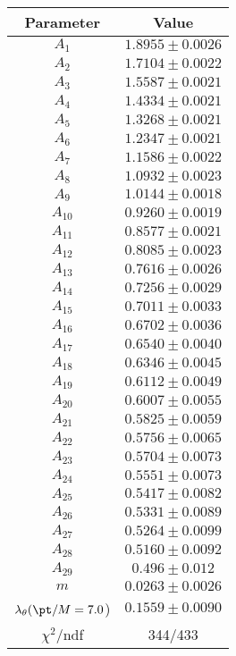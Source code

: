 \begin{tabular}{c|c}
Parameter & Value\\
\hline
$A_{1}$ & $1.8955\pm0.0026$ \\
$A_{2}$ & $1.7104\pm0.0022$ \\
$A_{3}$ & $1.5587\pm0.0021$ \\
$A_{4}$ & $1.4334\pm0.0021$ \\
$A_{5}$ & $1.3268\pm0.0021$ \\
$A_{6}$ & $1.2347\pm0.0021$ \\
$A_{7}$ & $1.1586\pm0.0022$ \\
$A_{8}$ & $1.0932\pm0.0023$ \\
$A_{9}$ & $1.0144\pm0.0018$ \\
$A_{10}$ & $0.9260\pm0.0019$ \\
$A_{11}$ & $0.8577\pm0.0021$ \\
$A_{12}$ & $0.8085\pm0.0023$ \\
$A_{13}$ & $0.7616\pm0.0026$ \\
$A_{14}$ & $0.7256\pm0.0029$ \\
$A_{15}$ & $0.7011\pm0.0033$ \\
$A_{16}$ & $0.6702\pm0.0036$ \\
$A_{17}$ & $0.6540\pm0.0040$ \\
$A_{18}$ & $0.6346\pm0.0045$ \\
$A_{19}$ & $0.6112\pm0.0049$ \\
$A_{20}$ & $0.6007\pm0.0055$ \\
$A_{21}$ & $0.5825\pm0.0059$ \\
$A_{22}$ & $0.5756\pm0.0065$ \\
$A_{23}$ & $0.5704\pm0.0073$ \\
$A_{24}$ & $0.5551\pm0.0073$ \\
$A_{25}$ & $0.5417\pm0.0082$ \\
$A_{26}$ & $0.5331\pm0.0089$ \\
$A_{27}$ & $0.5264\pm0.0099$ \\
$A_{28}$ & $0.5160\pm0.0092$ \\
$A_{29}$ & $0.496\pm0.012$ \\
$m$ & $0.0263\pm0.0026$ \\
$\lambda_\theta(\pt/M = 7.0$) & $0.1559\pm0.0090$ \\
\hline
$\chi^2$/ndf & 344/433
\end{tabular}
